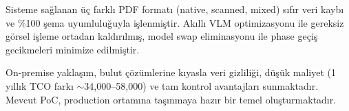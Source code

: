 \documentclass[11pt,a4paper]{article}
\begin{document}
Sisteme sağlanan üç farklı PDF formatı (native, scanned, mixed) sıfır veri kaybı ve \%100 şema uyumluluğuyla işlenmiştir. Akıllı VLM optimizasyonu ile gereksiz görsel işleme ortadan kaldırılmış, model swap eliminasyonu ile phase geçiş gecikmeleri minimize edilmiştir.

On-premise yaklaşım, bulut çözümlerine kıyasla veri gizliliği, düşük maliyet (1 yıllık TCO farkı $\sim$34,000--58,000) ve tam kontrol avantajları sunmaktadır. Mevcut PoC, production ortamına taşınmaya hazır bir temel oluşturmaktadır.
\end{document}
